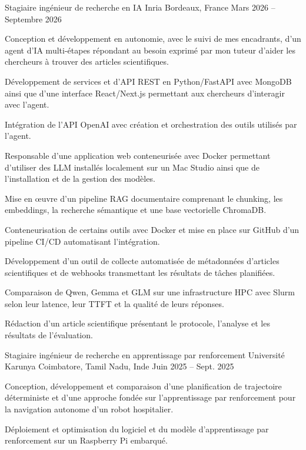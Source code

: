 
\begin{cventries}
  \cventry
    {Stagiaire ingénieur de recherche en IA}
    {Inria}
    {Bordeaux, France}
    {Mars 2026 -- Septembre 2026}
    {
      \begin{cvitems}
        \item {Conception et développement en autonomie, avec le suivi de mes encadrants, d’un agent d’IA multi-étapes répondant au besoin exprimé par mon tuteur d’aider les chercheurs à trouver des articles scientifiques.}
        \item {Développement de services et d’API REST en Python/FastAPI avec MongoDB ainsi que d’une interface React/Next.js permettant aux chercheurs d’interagir avec l’agent.}
        \item {Intégration de l’API OpenAI avec création et orchestration des outils utilisés par l’agent.}
        \item {Responsable d’une application web conteneurisée avec Docker permettant d’utiliser des LLM installés localement sur un Mac Studio ainsi que de l’installation et de la gestion des modèles.}
        \item {Mise en œuvre d’un pipeline RAG documentaire comprenant le chunking, les embeddings, la recherche sémantique et une base vectorielle ChromaDB.}
        \item {Conteneurisation de certains outils avec Docker et mise en place sur GitHub d’un pipeline CI/CD automatisant l’intégration.}
        \item {Développement d’un outil de collecte automatisée de métadonnées d’articles scientifiques et de webhooks transmettant les résultats de tâches planifiées.}
        \item {Comparaison de Qwen, Gemma et GLM sur une infrastructure HPC avec Slurm selon leur latence, leur TTFT et la qualité de leurs réponses.}
        \item {Rédaction d’un article scientifique présentant le protocole, l’analyse et les résultats de l’évaluation.}
      \end{cvitems}
    }

  \cventry
    {Stagiaire ingénieur de recherche en apprentissage par renforcement}
    {Université Karunya}
    {Coimbatore, Tamil Nadu, Inde}
    {Juin 2025 -- Sept. 2025}
    {
      \begin{cvitems}
        \item {Conception, développement et comparaison d’une planification de trajectoire déterministe et d’une approche fondée sur l’apprentissage par renforcement pour la navigation autonome d’un robot hospitalier.}
        \item {Déploiement et optimisation du logiciel et du modèle d’apprentissage par renforcement sur un Raspberry Pi embarqué.}
      \end{cvitems}
    }
\end{cventries}
